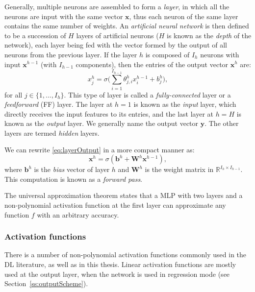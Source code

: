Generally, multiple neurons are assembled to form a \textit{layer}, in which all the neurons are input with the same vector $\mathbf{x}$, thus each neuron of the same layer contains the same number of weights. An \textit{artificial neural network} is then defined to be a succession of $H$ layers of artificial neurons ($H$ is known as the \textit{depth} of the network), each layer being fed with the vector formed by the output of all neurons from the previous layer. If the layer $h$ is composed of $I_h$ neurons with input $\mathbf{x}^{h-1}$ (with $I_{h-1}$ components), then the entries of the output vector $\mathbf{x}^h$ are:
\begin{equation}
\label{eq:layerOutput}
    x_j^h = \sigma \bigg( \sum_{i=1}^{I_{h-1}} \theta_{j,i}^h x_i^{h-1} + b_j^h \bigg),
\end{equation}
for all $j \in \{1, ..., I_h\}$. This type of layer is called a \textit{fully-connected} layer or a \textit{feedforward} (FF) layer. The layer at $h=1$ is known as the \textit{input} layer, which directly receives the input features to its entries, and the last layer at $h=H$ is known as the \textit{output} layer. We generally name the output vector $\mathbf{y}$. The other layers are termed \textit{hidden} layers. 

We can rewrite \eqref{eq:layerOutput} in a more compact manner as:
\begin{equation}
\label{eq:layerOutputVectorized}
    \mathbf{x}^h = \sigma(\mathbf{b}^h + \mathbf{W}^h \mathbf{x}^{h-1}),
\end{equation}
where $\mathbf{b}^h$ is the \textit{bias} vector of layer $h$ and $\mathbf{W}^h$ is the weight matrix in $\mathbb{R}^{I_h \times I_{h-1}}$. This computation is known as a \textit{forward pass}.

The universal approximation theorem \cite{hornik_multilayer_1989} states that a MLP with two layers and a non-polynomial activation function at the first layer can approximate any function $f$ with an arbitrary accuracy.

\subsubsection{Activation functions}

There is a number of non-polynomial activation functions commonly used in the DL literature, as well as in this thesis. Linear activation functions are mostly used at the output layer, when the network is used in regression mode (see Section~\ref{ss:outputScheme}).

